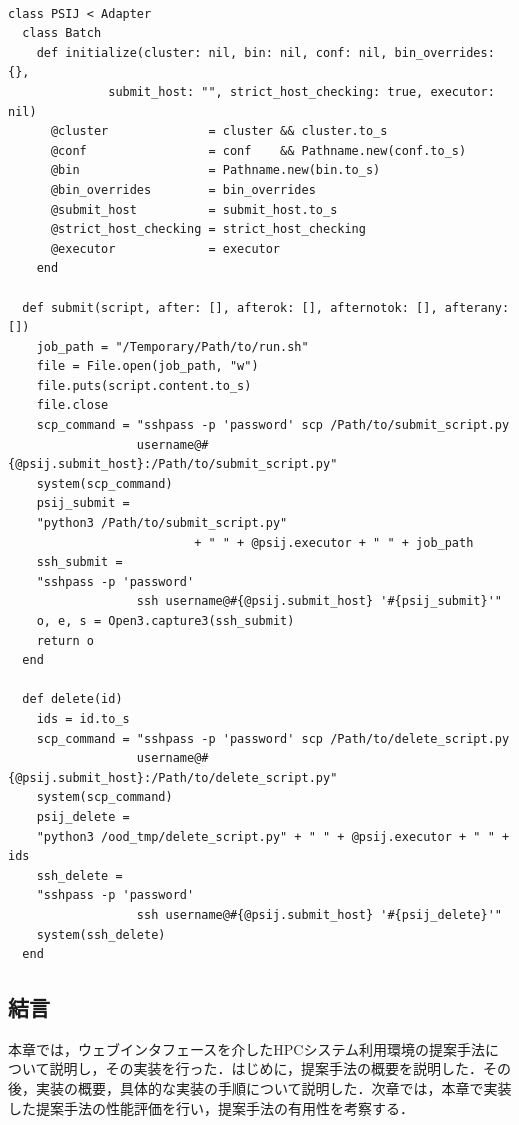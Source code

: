 \begin{lstlisting}[caption=PSI/JとOODの連携, label=psij_to_ood]

class PSIJ < Adapter
  class Batch
    def initialize(cluster: nil, bin: nil, conf: nil, bin_overrides: {}, 
              submit_host: "", strict_host_checking: true, executor: nil)
      @cluster              = cluster && cluster.to_s
      @conf                 = conf    && Pathname.new(conf.to_s)
      @bin                  = Pathname.new(bin.to_s)
      @bin_overrides        = bin_overrides
      @submit_host          = submit_host.to_s
      @strict_host_checking = strict_host_checking
      @executor             = executor
    end

  def submit(script, after: [], afterok: [], afternotok: [], afterany: [])
    job_path = "/Temporary/Path/to/run.sh" 
    file = File.open(job_path, "w")
    file.puts(script.content.to_s)
    file.close
    scp_command = "sshpass -p 'password' scp /Path/to/submit_script.py 
                  username@#{@psij.submit_host}:/Path/to/submit_script.py"
    system(scp_command)
    psij_submit = 
    "python3 /Path/to/submit_script.py" 
                          + " " + @psij.executor + " " + job_path
    ssh_submit = 
    "sshpass -p 'password' 
                  ssh username@#{@psij.submit_host} '#{psij_submit}'"
    o, e, s = Open3.capture3(ssh_submit)
    return o
  end
  
  def delete(id)
    ids = id.to_s
    scp_command = "sshpass -p 'password' scp /Path/to/delete_script.py 
                  username@#{@psij.submit_host}:/Path/to/delete_script.py"
    system(scp_command)
    psij_delete = 
    "python3 /ood_tmp/delete_script.py" + " " + @psij.executor + " " + ids
    ssh_delete = 
    "sshpass -p 'password' 
                  ssh username@#{@psij.submit_host} '#{psij_delete}'"
    system(ssh_delete)
  end

\end{lstlisting}

\subsection{結言}
本章では，ウェブインタフェースを介したHPCシステム利用環境の提案手法について説明し，その実装を行った．はじめに，提案手法の概要を説明した．その後，実装の概要，具体的な実装の手順について説明した．次章では，本章で実装した提案手法の性能評価を行い，提案手法の有用性を考察する．